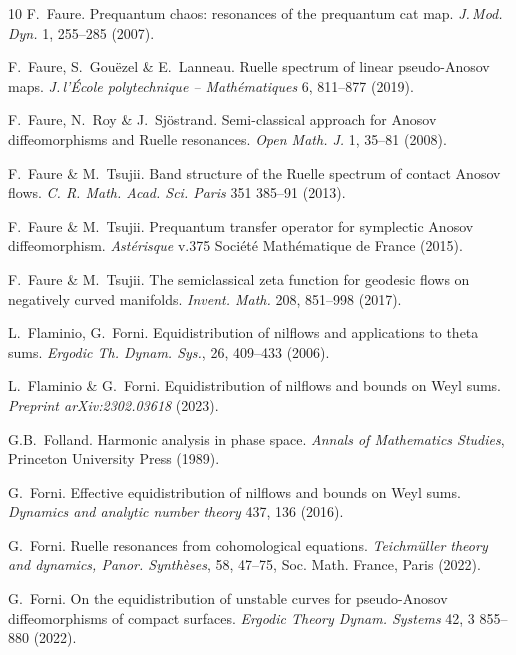 \documentclass[a4paper,11pt]{amsart}
\theoremstyle{remark}
\begin{document}
\begin{thebibliography}{10}
    F.~Faure.
    Prequantum chaos: resonances of the prequantum cat map.
    \emph{J.\,Mod.\,Dyn.} 1, 255--285 (2007).

    F.~Faure, S.~Gouëzel \& E.~Lanneau.
    Ruelle spectrum of linear pseudo-Anosov maps.
    \emph{J.\,l'École polytechnique -- Mathématiques} 6, 811--877 (2019).

    F.~Faure, N.~Roy \& J.~Sjöstrand. 
    Semi-classical approach for Anosov diffeomorphisms and Ruelle resonances. 
    \emph{Open Math. J.} 1, 35--81 (2008).

    F.~Faure \& M.~Tsujii.
    Band structure of the Ruelle spectrum of contact Anosov flows.
    \emph{C. R. Math. Acad. Sci. Paris} 351 385--91 (2013).

    F.~Faure \& M.~Tsujii.
    Prequantum transfer operator for symplectic Anosov diffeomorphism.
    \emph{Astérisque} v.375 Société Mathématique de France (2015).

    F.~Faure \& M.~Tsujii.
    \newblock The semiclassical zeta function for geodesic flows on negatively curved manifolds.
    \newblock \emph{Invent. Math.} 208, 851--998 (2017).

    L.~Flaminio, G.~Forni.
    Equidistribution of nilflows and applications to theta sums.
    \emph{Ergodic Th. Dynam. Sys.}, 26, 409--433 (2006).

    L.~Flaminio \& G.~Forni. 
    Equidistribution of nilflows and bounds on Weyl sums. 
    \emph{Preprint arXiv:2302.03618} (2023).

    G.B.~Folland.
    Harmonic analysis in phase space.
    \emph{Annals of Mathematics Studies}, Princeton University Press (1989).

    G.~Forni.
    Effective equidistribution of nilflows and bounds on Weyl sums.
    \emph{Dynamics and analytic number theory} 437, 136 (2016).

    G.~Forni.
    Ruelle resonances from cohomological equations.
    \emph{Teichmüller theory and dynamics, Panor. Synthèses}, {58}, {47--75}, Soc. Math. France, Paris (2022).

    G.~Forni.
    On the equidistribution of unstable curves for pseudo-Anosov diffeomorphisms of compact surfaces.
    \emph{Ergodic Theory Dynam. Systems} 42, 3 855--880 (2022).


\end{thebibliography}
\end{document}
